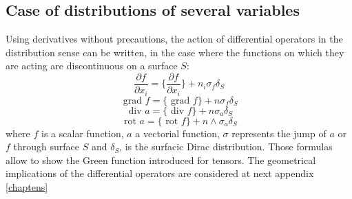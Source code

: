 \documentclass[12pt]{book}
\begin{document}
\subsection{Case of distributions of several variables}\label{secdisplu}
Using derivatives without precautions, the action of differential operators in
the distribution sense can be written, in the case where the functions on
which they are acting are discontinuous on a surface $S$:
\begin{equation}
\frac{\partial f}{\partial x_i}=\{\frac{\partial f}{\partial
x_i}\}+n_i\sigma_f \delta_S
\end{equation}
\begin{equation}
\mbox{ grad } f=\{\mbox{ grad } f\}+n \sigma_f \delta_S
\end{equation}
\begin{equation}
\mbox{ div } a=\{ \mbox{ div } f\}+n \sigma_a \delta_S
\end{equation}
\begin{equation}
\mbox{ rot } a = \{\mbox{ rot } f\}+n\wedge \sigma_a \delta_S
\end{equation}
where $f$ is a scalar function, $a$ a vectorial function, $\sigma$
represents the jump of $a$ or $f$ through surface $S$ and $\delta_S$, is the
surfacic Dirac distribution. Those formulas allow to show the Green function
introduced for tensors.
The geometrical implications of the differential operators are considered at
next appendix \ref{chaptens}
\end{document}
